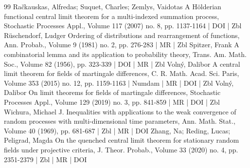 \begin{thebibliography}{99}
 Račkauskas, Alfredas; Suquet, Charles; Zemlys, Vaidotas A Hölderian functional central limit theorem for a multi-indexed summation process, Stochastic Processes Appl., Volume 117 (2007) no. 8, pp. 1137-1164 | DOI | Zbl
 Rüschendorf, Ludger Ordering of distributions and rearrangement of functions, Ann. Probab., Volume 9 (1981) no. 2, pp. 276-283 | MR | Zbl
 Spitzer, Frank A combinatorial lemma and its application to probability theory, Trans. Am. Math. Soc., Volume 82 (1956), pp. 323-339 | DOI | MR | Zbl
 Volný, Dalibor A central limit theorem for fields of martingale differences, C. R. Math. Acad. Sci. Paris, Volume 353 (2015) no. 12, pp. 1159-1163 | Numdam | MR | DOI | Zbl
 Volný, Dalibor On limit theorems for fields of martingale differences, Stochastic Processes Appl., Volume 129 (2019) no. 3, pp. 841-859 | MR | DOI | Zbl
 Wichura, Michael J. Inequalities with applications to the weak convergence of random processes with multi-dimensional time parameters, Ann. Math. Stat., Volume 40 (1969), pp. 681-687 | Zbl | MR | DOI
 Zhang, Na; Reding, Lucas; Peligrad, Magda On the quenched central limit theorem for stationary random fields under projective criteria, J. Theor. Probab., Volume 33 (2020) no. 4, pp. 2351-2379 | Zbl | MR | DOI
\end{thebibliography}
